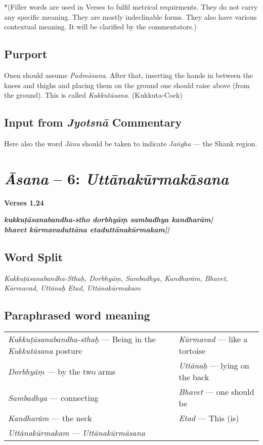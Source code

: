 *(Filler words are used in Verses to fulfil metrical requirments. They do not carry any specific meaning. They are mostly indeclinable forms. They also have various contextual meaning. It will be clarified by the commentators.)


\subsection*{Purport}

Onen should assume \textit{Padmāsana}. After that, inserting the hands in between the knees and thighs and placing them on the ground one should raise above (from the ground). This is called \textit{Kukkutāsana}. (Kukkuta-Cock)
\vspace{-10pt}

\subsection*{Input from \textit{Jyotsnā} Commentary}

Here also the word \textit{Jānu} should be taken to indicate \textit{Jaṅgha} --- the Shank region. 

\section*{\textit{Āsana} -- 6: \textit{Uttānakūrmakāsana}}

\noindent \textbf{Verses 1.24}

\begin{shloka}
\textit{\textbf{kukkuṭāsanabandha-stho dorbhyāṃ sambadhya kandharām|}\\
\textbf{bhavet kūrmavaduttāna etaduttānakūrmakam||}}
\end{shloka}

\subsection*{Word Split}

\textit{Kukkuṭāsanabandha-Sthaḥ,  Dorbhyāṃ, Sambadhya,  Kandharām, Bhavet,  Kūrmavad, Uttānaḥ Etad, Uttānakūrmakam}

\subsection*{Paraphrased word meaning}

\begin{longtable}{>{\noindent\raggedright}p{5cm}>{\noindent\raggedright}p{5cm}}
\textit{Kukkuṭāsanabandha-sthaḥ} --- Being in the \textit{Kukkutāsana} posture  & \textit{Kūrmavad} --- like a tortoise\tabularnewline
\textit{Dorbhyāṃ} --- by the two arms  & \textit{Uttānaḥ} --- lying on the back\tabularnewline
\textit{Sambadhya} --- connecting  & \textit{Bhavet} --- one should be\tabularnewline
\textit{Kandharām} --- the neck  & \textit{Etad} --- This (is)\tabularnewline
\textit{Uttānakūrmakam} --- \textit{Uttānakūrmāsana} & 
\end{longtable}

